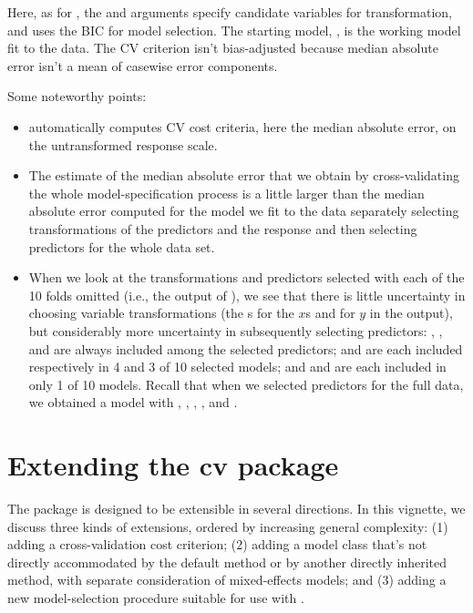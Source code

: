 \documentclass[
]{jss}
\providecommand{\tightlist}{%
  \setlength{\itemsep}{0pt}\setlength{\parskip}{0pt}}
\begin{document}
Here, as for , the  and
 arguments specify candidate variables for
transformation, and  uses the BIC for model selection.
The starting model, , is the working model fit to the
 data. The CV criterion isn't bias-adjusted because median
absolute error isn't a mean of casewise error components.

Some noteworthy points:

\begin{itemize}
\tightlist
\item
   automatically computes CV cost criteria,
  here the median absolute error, on the untransformed response scale.
\item
  The estimate of the median absolute error that we obtain by
  cross-validating the whole model-specification process is a little
  larger than the median absolute error computed for the model we fit to
  the  data separately selecting transformations of the
  predictors and the response and then selecting predictors for the
  whole data set.
\item
  When we look at the transformations and predictors selected with each
  of the 10 folds omitted (i.e., the output of ),
  we see that there is little uncertainty in choosing variable
  transformations (the s for the \(x\)s and 
  for \(y\) in the output), but considerably more uncertainty in
  subsequently selecting predictors: , ,
  and  are always included among the selected predictors;
   and  are each included
  respectively in 4 and 3 of 10 selected models; and 
  and  are each included in only 1 of 10 models. Recall
  that when we selected predictors for the full data, we obtained a
  model with , , ,
  , and .
\end{itemize}

\hypertarget{extending-the-cv-package}{%
\section{Extending the cv package}\label{extending-the-cv-package}}

The  package is designed to be extensible in several directions.
In this vignette, we discuss three kinds of extensions, ordered by
increasing general complexity: (1) adding a cross-validation cost
criterion; (2) adding a model class that's not directly accommodated by
the  default method or by another directly inherited method,
with separate consideration of mixed-effects models; and (3) adding a
new model-selection procedure suitable for use with
.
\end{document}
